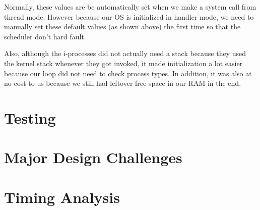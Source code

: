 \documentclass[se]{uw-wkrpt}
\begin{document}
\begin{enumerate}
	Normally, these values are be automatically set when we make a system call from thread mode. However because our OS is initialized in handler mode, we need to manually set these default values (as shown above) the first time so that the scheduler don't hard fault. 
	
	Also, although the i-processes did not actually need a stack because they used the kernel stack whenever they got invoked, it made initialization a lot easier because our loop did not need to check process types. In addition, it was also at no cost to us because we still had leftover free space in our RAM in the end. 
	
\end{enumerate}

\section{Testing}\label{sec:test}

\section{Major Design Challenges}\label{sec:design}

\section{Timing Analysis}\label{sec:time}
\end{document}
